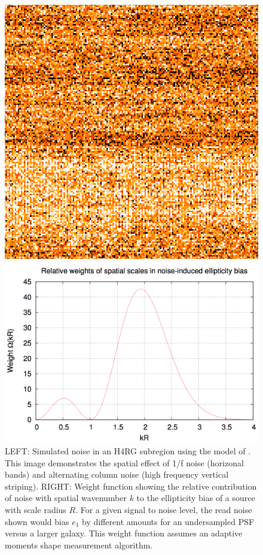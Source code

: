 \begin{figure}
\centering
\begin{minipage}{.4\textwidth}
  \centering
  \includegraphics[width=.7\linewidth]{Plots/correlated_noise_sim.png}
\end{minipage}%
\begin{minipage}{.4\textwidth}
  \centering
  \includegraphics[width=1\linewidth]{Plots/correlated_noise_weight.png}
\end{minipage}
\caption{LEFT: Simulated noise in an H4RG subregion using the model of \cite{Rauscher2015}.  This image demonstrates the spatial effect of 1/f noise (horizonal bands) and alternating column noise (high frequency vertical striping).  RIGHT: Weight function showing the relative contribution of noise with spatial wavenumber $k$ to the ellipticity bias of a source with scale radius $R$.  For a given signal to noise level, the read noise shown would bias $e_1$ by different amounts for an undersampled PSF versus a larger galaxy.  This weight function assumes an adaptive moments shape measurement algorithm.}
\label{fig:correlated_noise}
\end{figure}

